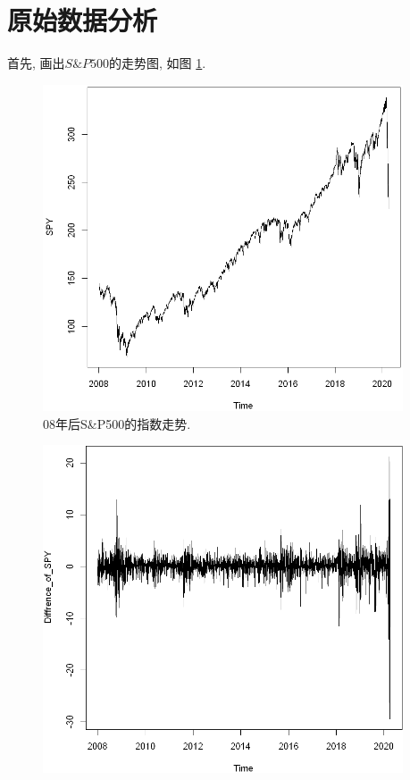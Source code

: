 \documentclass[11pt]{article}
\begin{document}
\section{原始数据分析}
\qquad 首先, 画出$S\&P500$的走势图, 如图 \ref{fig:1}.
\begin{center}
    \hspace{30pt}\begin{minipage}{0.35\textwidth}
        \begin{figure}
            \centering
            \hspace{-30pt}\includegraphics[width=0.95\textwidth]{output_3_0}
            \caption{08年后S\&P500的指数走势.\label{fig:1}}
        \end{figure}
    \end{minipage}
    \begin{minipage}{0.35\textwidth}
        \begin{figure}
            \centering
            \hspace{-25pt}\includegraphics[width=0.95\textwidth]{output_4_0}

\end{figure}
\end{minipage}
\end{center}
\end{document}
